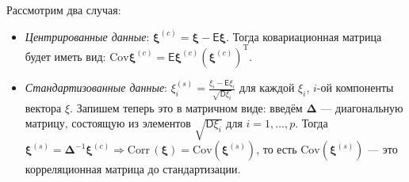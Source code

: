\documentclass[specialist, 12pt,
subf, %
href, colorlinks=true,
substylefile = spbu.rtx,
]{disser}
\begin{document}
Рассмотрим два случая:
\begin{itemize}
	\item \textit{Центрированные данные}: $\bm\xi^{(c)} = 
\bm\xi - \textsf{E} \bm\xi$. Тогда ковариационная матрица будет иметь вид: $\mathrm{Cov}\bm\xi^{(c)} = \textsf{E}\bm\xi^{(c)}(\bm\xi^{(c)})^{\mathrm{T}}$.
	\item \textit{Стандартизованные данные}: $\xi_i^{(s)} = \frac{\xi_i - \textsf{E}\xi_i}{\sqrt{\textsf{D}\xi_i}}$ для каждой $\xi_i$, $i$-ой компоненты вектора $\xi$. Запишем теперь это в матричном виде:
	 введём $\bm\Delta$ --- диагональную матрицу, состоящую из элементов $\sqrt{\textsf{D} \xi_i}$ для $i = 1, \ldots, p$. Тогда $\bm\xi^{(s)} = \bm\Delta^{-1} \bm\xi^{(c)} \Rightarrow \mathrm{Corr\,} (\bm\xi) = \mathrm{Cov} (\bm\xi^{(s)})$, то есть $\mathrm{Cov}(\bm\xi^{(s)})$ --- это корреляционная матрица до стандартизации.
\end{itemize}
\end{document}
